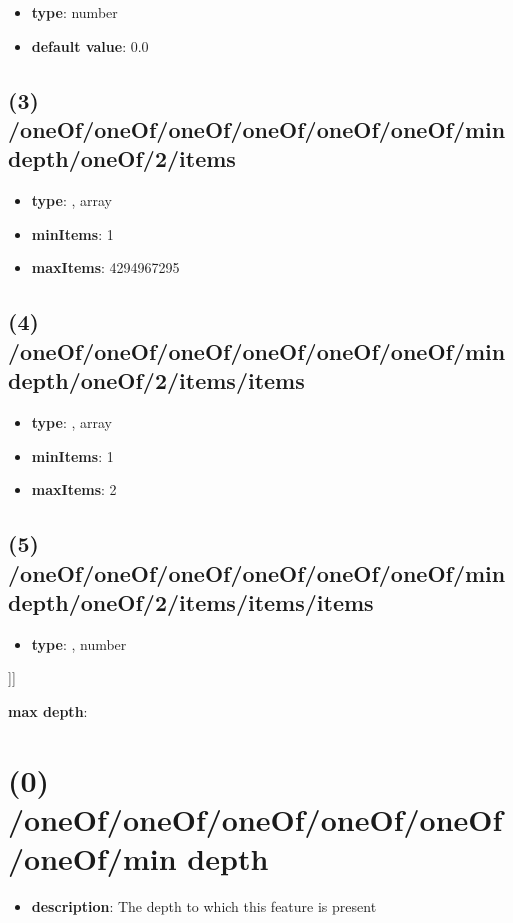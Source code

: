 \begin{itemize}[leftmargin=4em]\item {\bf type}: number\item {\bf default value}: 0.0
\end{itemize}\subsection{(3) /oneOf/oneOf/oneOf/oneOf/oneOf/oneOf/min depth/oneOf/2/items}
\begin{itemize}[leftmargin=3em]\item {\bf type}: , array\item {\bf minItems}: 1
\item {\bf maxItems}: 4294967295
\end{itemize}\subsection{(4) /oneOf/oneOf/oneOf/oneOf/oneOf/oneOf/min depth/oneOf/2/items/items}
\begin{itemize}[leftmargin=4em]\item {\bf type}: , array\item {\bf minItems}: 1
\item {\bf maxItems}: 2
\end{itemize}\subsection{(5) /oneOf/oneOf/oneOf/oneOf/oneOf/oneOf/min depth/oneOf/2/items/items/items}
\begin{itemize}[leftmargin=5em]\item {\bf type}: , number\end{itemize}]]\item {\bf max depth}: \section{(0) /oneOf/oneOf/oneOf/oneOf/oneOf/oneOf/min depth}
\begin{itemize}[leftmargin=0em]\item {\bf description}: The depth to which this feature is present
\end{itemize}
